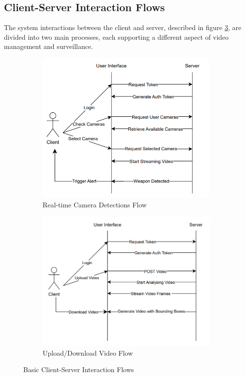 \subsection{Client-Server Interaction Flows}
The system interactions between the client and server, described in figure \ref{fig:flows}, are divided 
into two main processes, each supporting a different aspect of video management and surveillance. 
\begin{figure}[h]
    \centering
    \begin{subfigure}[b]{0.49\textwidth}
        \centering
        \includegraphics[width=\linewidth]{figs/flow1.png}
        \caption{Real-time Camera Detections Flow}
        \label{fig:flow1}
    \end{subfigure}
    \hfill %
    \begin{subfigure}[b]{0.49\textwidth}
        \centering
        \includegraphics[width=\linewidth]{figs/flow2.png}
        \caption{Upload/Download Video Flow}
        \label{fig:flow2}
    \end{subfigure}
    \caption{Basic Client-Server Interaction Flows}
    \label{fig:flows}
\end{figure}

